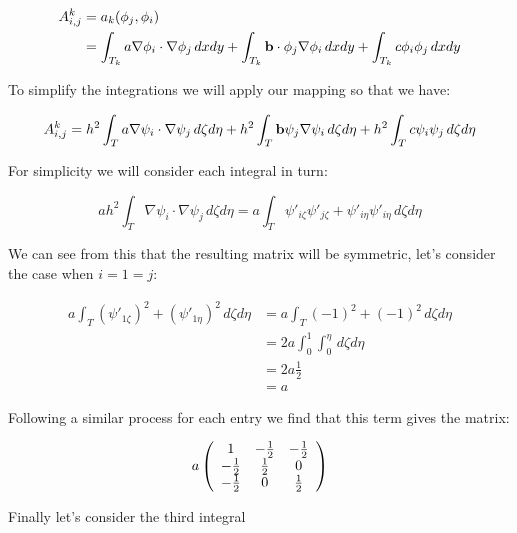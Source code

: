 \begin{align*}
    A^k_{i,j} &= a_k(\phi_j, \phi_i) \\
     &= \int_{T_k}a\nabla\phi_i\cdot\nabla\phi_j\,dxdy +
        \int_{T_k}\mathbf{b}\cdot\phi_j\nabla\phi_i\,dxdy +
        \int_{T_k}c\phi_i\phi_j\,dxdy
\end{align*}

To simplify the integrations we will apply our mapping so that we have:

\[
    A^k_{i,j} = h^2\int_Ta\nabla\psi_i\cdot\nabla\psi_j\,d\zeta d\eta +
                h^2\int_T\mathbf{b}\psi_j\nabla\psi_i\,d\zeta d\eta +
                h^2\int_Tc\psi_i\psi_j\,d\zeta d\eta
\]

For simplicity we will consider each integral in turn:

\[
    ah^2\int_T\nabla\psi_i\cdot\nabla\psi_j\,d\zeta d\eta =
    a\int_T\psi'_{i\zeta}\psi'_{j\zeta} +
        \psi'_{i\eta}\psi'_{i\eta}\,d\zeta d\eta
\]

We can see from this that the resulting matrix will be symmetric, let's
consider the case when $i = 1 = j$:

\begin{align*}
    a\int_T(\psi'_{1\zeta})^2 + (\psi'_{1\eta})^2\,d\zeta d\eta & =
        a\int_T(-1)^2 + (-1)^2\,d\zeta d\eta \\
    &= 2a\int_0^1\int_0^\eta\,d\zeta d\eta \\
    &= 2a\frac{1}{2} \\
    &= a
\end{align*}

Following a similar process for each entry we find that this term gives the
matrix:

\begin{equation}\label{eq:stiffness_term_1}
    a\left(\begin{array}{c c c}
        1      & -\frac{1}{2} & -\frac{1}{2} \\
        -\frac{1}{2} & \frac{1}{2}  & 0 \\
        -\frac{1}{2} & 0      & \frac{1}{2}
    \end{array}\right)
\end{equation}

Finally let's consider the third integral

